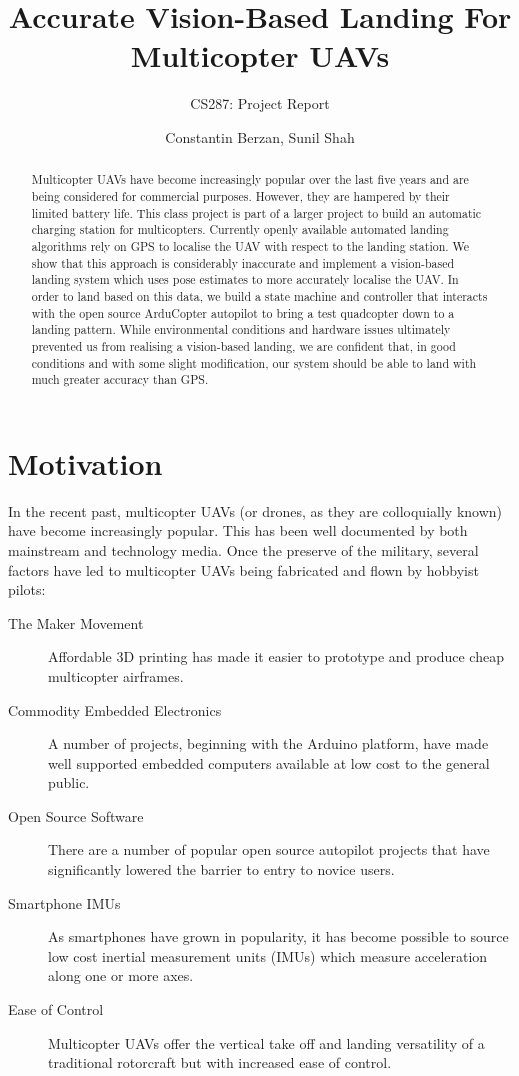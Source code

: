 \documentclass[10pt]{scrartcl} %
\title{Accurate Vision-Based Landing For Multicopter UAVs}
\subtitle{CS287: Project Report}
\author{Constantin Berzan, Sunil Shah}
\date{}
\begin{document}
\maketitle

\begin{abstract}
Multicopter UAVs have become increasingly popular over the last five years and
are being considered for commercial purposes. However, they are hampered by
their limited battery life. This class project is part of a larger project to
build an automatic charging station for multicopters. Currently openly
available automated landing algorithms rely on GPS to localise the UAV with
respect to the landing station. We show that this approach is considerably
inaccurate and implement a vision-based landing system which uses pose
estimates to more accurately localise the UAV.  In order to land based on this
data, we build a state machine and controller that interacts with the open
source ArduCopter autopilot to bring a test quadcopter down to a landing
pattern. While environmental conditions and hardware issues ultimately
prevented us from realising a vision-based landing, we are confident that, in
good conditions and with some slight modification, our system should be able to
land with much greater accuracy than GPS.
\end{abstract}

\section{Motivation}

In the recent past, multicopter UAVs (or drones, as they are colloquially
known) have become increasingly popular. This has been well documented by both
mainstream and technology media. Once the preserve of the military, several
factors have led to multicopter UAVs being fabricated and flown by hobbyist
pilots:

\begin{description}
\item[The Maker Movement]{Affordable 3D printing has made it easier to
prototype and produce cheap multicopter airframes.}
\item[Commodity Embedded Electronics]{A number of projects, beginning with the
Arduino platform, have made well supported embedded computers available at low
cost to the general public.}
\item[Open Source Software]{There are a number of popular open source autopilot
projects that have significantly lowered the barrier to entry to novice users.}
\item[Smartphone IMUs]{As smartphones have grown in popularity, it has become
possible to source low cost inertial measurement units (IMUs) which measure
acceleration along one or more axes.}
\item[Ease of Control]{Multicopter UAVs offer the vertical take off and landing
versatility of a traditional rotorcraft but with increased ease of control.}
\end{description}
\end{document}
